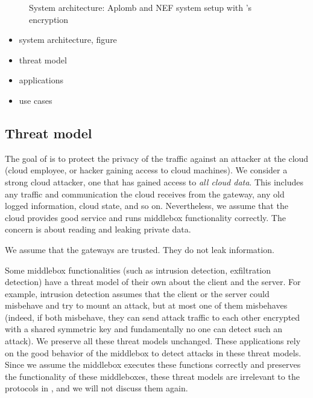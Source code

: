 \begin{figure}[t!]
\centering
{}
%
\vfill  
{}
%
\caption{System architecture: Aplomb and NEF system setup with \sys's encryption \label{fig:sys-overview}}
\end{figure}

\begin{itemize}
\item system architecture, figure
\item threat model
\item applications
\item use cases
\end{itemize}

\subsection{Threat model}

The goal of \sys is to protect the privacy of the traffic against an attacker at the cloud 
(cloud employee, or hacker gaining access to cloud machines). 
We consider a strong cloud attacker, one that has gained access to {\em all cloud data}.
This includes any traffic and communication the cloud receives from the 
gateway, any old logged information, cloud state, and so on. Nevertheless, we assume that 
the cloud provides good service and runs middlebox functionality correctly.  The concern is
about reading and leaking private data. 

We assume that the gateways are trusted. They do not leak information.


Some middlebox functionalities (such as intrusion detection, exfiltration detection) have a threat model
of their own about the client and the server. For example, intrusion detection assumes that 
the client or the server could misbehave and try to mount an attack, but at most one of them misbehaves 
(indeed, if both misbehave, they can send attack traffic to each other encrypted with a shared symmetric key and fundamentally
no one can detect such an attack).  We preserve all these threat models unchanged. These applications rely
on the good behavior of the middlebox to detect attacks in these threat models. Since we assume the middlebox executes
these functions correctly and \sys preserves the functionality of these middleboxes, 
these threat models are irrelevant to the protocols in \sys, and we will not discuss them again. 



